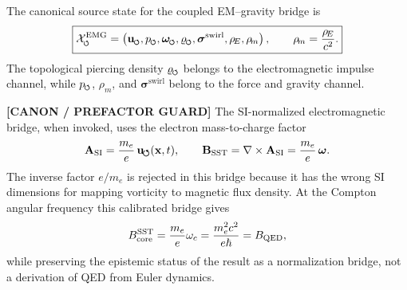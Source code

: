\documentclass[11pt]{article}
\theoremstyle{definition}
\theoremstyle{plain}
\theoremstyle{remark}
\newcommand{\swirlarrow}{\mathchoice{\mkern-2mu\scriptstyle\boldsymbol{\circlearrowleft}}{\mkern-2mu\scriptstyle\boldsymbol{\circlearrowleft}}{\mkern-2mu\scriptscriptstyle\boldsymbol{\circlearrowleft}}{\mkern-2mu\scriptscriptstyle\boldsymbol{\circlearrowleft}}}
\newcommand{\rhoE}{\rho_{\!E}}
\newcommand{\rhoM}{\rho_{\!m}}
\newcommand{\uswirl}{\mathbf{u}_{\!\boldsymbol{\circlearrowleft}}}
\begin{document}
        The canonical source state for the coupled EM--gravity bridge is
        \begin{align}
            \boxed{
            \mathcal{X}^{\mathrm{EMG}}_{\swirlarrow}
            =
            \left(
            \mathbf{u}_{\swirlarrow},
            p_{\swirlarrow},
            \boldsymbol{\omega}_{\swirlarrow},
            \varrho_{\swirlarrow},
            \boldsymbol{\sigma}^{\mathrm{swirl}},
            \rhoE,
            \rhoM
            \right),
            \qquad
            \rhoM=\frac{\rhoE}{c^2}.
            }
            \label{eq:emg_source_state}
        \end{align}
        The topological piercing density \(\varrho_{\swirlarrow}\) belongs to the electromagnetic impulse channel, while \(p_{\swirlarrow}\), \(\rhoM\), and \(\boldsymbol{\sigma}^{\mathrm{swirl}}\) belong to the force and gravity channel.

        \textbf{[CANON / PREFACTOR GUARD]} The SI-normalized electromagnetic bridge, when invoked, uses the electron mass-to-charge factor
        \begin{align}
            \mathbf{A}_{\rm SI}
            =
            \frac{m_e}{e}\,\uswirl(\mathbf{x},t),
            \qquad
            \mathbf{B}_{\rm SST}
            =
            \nabla\times\mathbf{A}_{\rm SI}
            =
            \frac{m_e}{e}\,\boldsymbol{\omega}.
            \label{eq:canonical_em_prefactor_guard}
        \end{align}
        The inverse factor \(e/m_e\) is rejected in this bridge because it has the wrong SI dimensions for mapping vorticity to magnetic flux density. At the Compton angular frequency this calibrated bridge gives
        \begin{align}
            B_{\rm core}^{\rm SST}
            =
            \frac{m_e}{e}\omega_c
            =
            \frac{m_e^2c^2}{e\hbar}
            =
            B_{\rm QED},
            \label{eq:canonical_qed_field_guard}
        \end{align}
        while preserving the epistemic status of the result as a normalization bridge, not a derivation of QED from Euler dynamics.
\end{document}

